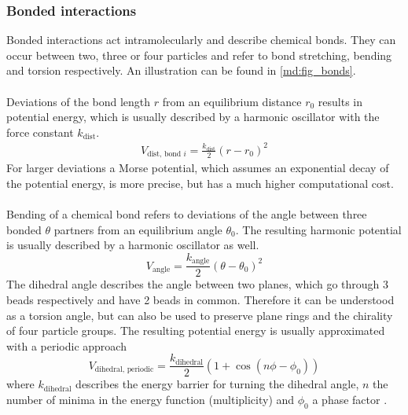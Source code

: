 \subsubsection{Bonded interactions}
Bonded interactions act intramolecularly and describe chemical bonds. They can occur between two, three or four particles and refer to bond stretching, bending and torsion respectively. An illustration can be found in \autoref{md:fig_bonds}.\\
\\
Deviations of the bond length $r$ from an equilibrium distance $r_0$ results in potential energy, which is usually described by a harmonic oscillator with the force constant $k_\text{dist}$.
\begin{align}
V_{\text{dist, bond }i} = \frac{k_{\text{dist}}}{2}\left( r - r_{0} \right)^2
\end{align}
For larger deviations a Morse potential, which assumes an exponential decay of the potential energy, is more precise, but has a much higher computational cost.\\
\\
Bending of a chemical bond refers to deviations of the angle between three bonded $\theta$ partners from an equilibrium angle $\theta_0$. The resulting harmonic potential is usually described by a harmonic oscillator as well.
\begin{equation}
V_\text{angle} = \frac{k_\text{angle}}{2}\left( \theta - \theta_0 \right)^2
\end{equation}
The dihedral angle describes the angle between two planes, which go through 3 beads respectively and have 2 beads in common. Therefore it can be understood as a torsion angle, but can also be used to preserve plane rings and the chirality of four particle groups. The resulting potential energy is usually approximated with a periodic approach
\begin{equation}
V_{\text{dihedral, periodic}} = \frac{k_\text{dihedral}}{2}\left(1 + \cos\left(n \phi - \phi_0 \right)\right)
\end{equation}
where $k_\text{dihedral}$ describes the energy barrier for turning the dihedral angle, $n$ the number of minima in the energy function (multiplicity) and $\phi_0$ a phase factor \autocite[p. 71-83]{gromacsManual}.
%
%
%
